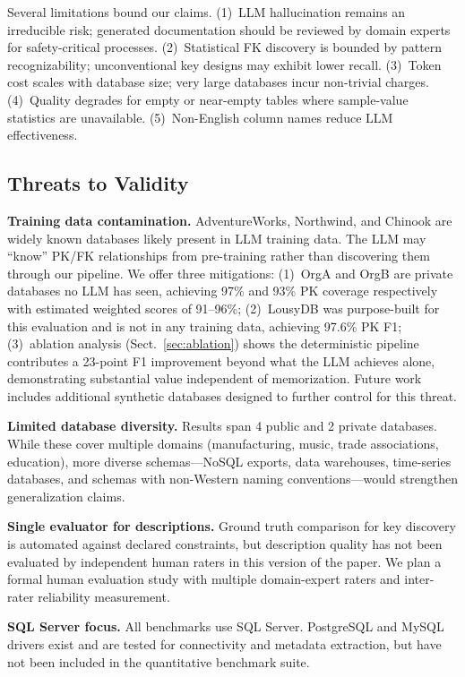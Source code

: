 \documentclass[twocolumn]{svjour3}
\begin{document}
Several limitations bound our claims. (1)~LLM hallucination remains an irreducible risk; generated documentation should be reviewed by domain experts for safety-critical processes. (2)~Statistical FK discovery is bounded by pattern recognizability; unconventional key designs may exhibit lower recall. (3)~Token cost scales with database size; very large databases incur non-trivial charges. (4)~Quality degrades for empty or near-empty tables where sample-value statistics are unavailable. (5)~Non-English column names reduce LLM effectiveness.

\subsection{Threats to Validity}\label{sec:threats}

\textbf{Training data contamination.} AdventureWorks, Northwind, and Chinook are widely known databases likely present in LLM training data. The LLM may ``know'' PK/FK relationships from pre-training rather than discovering them through our pipeline. We offer three mitigations: (1)~OrgA and OrgB are private databases no LLM has seen, achieving 97\% and 93\% PK coverage respectively with estimated weighted scores of 91--96\%; (2)~LousyDB was purpose-built for this evaluation and is not in any training data, achieving 97.6\% PK F1; (3)~ablation analysis (Sect.~\ref{sec:ablation}) shows the deterministic pipeline contributes a 23-point F1 improvement beyond what the LLM achieves alone, demonstrating substantial value independent of memorization. Future work includes additional synthetic databases designed to further control for this threat.

\textbf{Limited database diversity.} Results span 4 public and 2 private databases. While these cover multiple domains (manufacturing, music, trade associations, education), more diverse schemas---NoSQL exports, data warehouses, time-series databases, and schemas with non-Western naming conventions---would strengthen generalization claims.

\textbf{Single evaluator for descriptions.} Ground truth comparison for key discovery is automated against declared constraints, but description quality has not been evaluated by independent human raters in this version of the paper. We plan a formal human evaluation study with multiple domain-expert raters and inter-rater reliability measurement.

\textbf{SQL Server focus.} All benchmarks use SQL Server. PostgreSQL and MySQL drivers exist and are tested for connectivity and metadata extraction, but have not been included in the quantitative benchmark suite.
\end{document}
